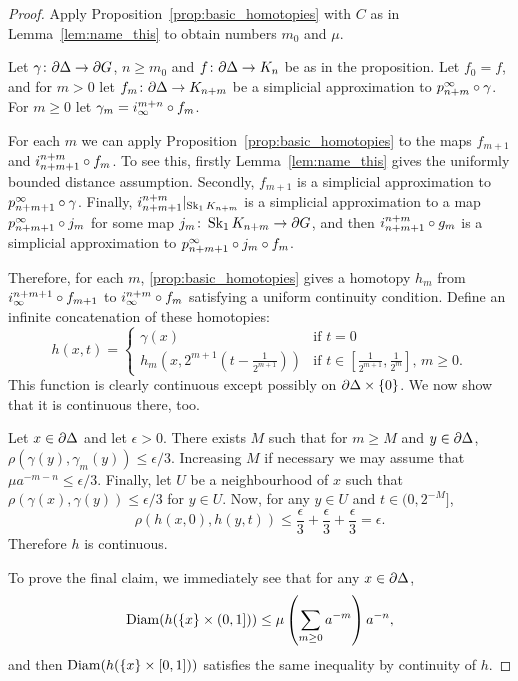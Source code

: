 \documentclass[a4paper]{article}
\begin{document}
\begin{proof}
  Apply Proposition~\ref{prop:basic_homotopies} with $C$ as in
  Lemma~\ref{lem:name_this} to obtain numbers $m_0$ and $\mu$.
  
  Let $\gamma\colon\partial\Delta\to\partial G$, $n\geq m_0$ and
  $f\colon\partial\Delta\to K_n$ be as in the proposition. Let $f_0 = f$,
  and for $m > 0$ let $f_m\colon\partial\Delta\to K_{n+m}$ be a
  simplicial approximation to $p^\infty_{n+m}\circ\gamma$. For $m \geq 0$
  let $\gamma_m = i^{m+n}_\infty\circ f_m$. 

  For each $m$ we can apply Proposition~\ref{prop:basic_homotopies} to the maps
  $f_{m+1}$ and $i^{n+m}_{n+m+1}\circ f_m$. To see this, firstly
  Lemma~\ref{lem:name_this} gives the uniformly bounded distance assumption.
  Secondly, $f_{m+1}$ is a simplicial approximation to
  $p^\infty_{n+m+1}\circ\gamma$. Finally,
  $i^{n+m}_{n+m+1}\vert_{\operatorname{Sk}_1 K_{n+m}}$ is a simplicial approximation
  to a map $p^\infty_{n+m+1}\circ j_m$ for some map $j_m\colon\operatorname{Sk}_1
  K_{n+m}\to \partial G$, and then $i^{n+m}_{n+m+1}\circ g_m$ is a
  simplicial approximation to $p^\infty_{n+m+1}\circ j_m\circ f_m$.
  
  Therefore, for each $m$, \cref{prop:basic_homotopies} gives a homotopy $h_m$
  from $i^{n+m+1}_\infty\circ f_{m+1}$ to $i^{n+m}_\infty \circ f_m$
  satisfying a uniform continuity condition. Define an infinite concatenation
  of these homotopies:
  \begin{equation*}
    h(x,t) = 
    \begin{cases}
      \gamma(x) & \text{if } t = 0\\
      h_m\left(x,2^{m+1}\left(t-\frac{1}{2^{m+1}}\right)\right) 
              & \text{if $t \in \left[\frac{1}{2^{m+1}}, \frac{1}{2^m}\right]$
                    , $m\geq 0$}.
    \end{cases}
  \end{equation*}
  This function is clearly continuous except possibly on
  $\partial\Delta\times\{0\}$. We now show that it is continuous there, too.

  Let $x \in \partial\Delta$ and let $\epsilon > 0$. There exists $M$ such
  that for $m \geq M$ and $y \in \partial \Delta$, $\rho(\gamma(y),
  \gamma_m(y)) \leq \epsilon/3$. Increasing $M$ if necessary we may assume that
  $\mu a^{-m-n} \leq \epsilon/3$.
  Finally, let $U$ be a neighbourhood of $x$ such that $\rho(\gamma(x),
  \gamma(y)) \leq \epsilon/3$ for $y \in U$. Now, for any $y \in U$ and $t \in (0, 2^{-M}]$,
  \begin{equation*}
    \rho(h(x,0), h(y,t)) \leq \frac{\epsilon}{3} + \frac{\epsilon}{3} +
        \frac{\epsilon}{3} = \epsilon.
  \end{equation*}
  Therefore $h$ is continuous.

  To prove the final claim, we immediately see that for any $x \in
  \partial\Delta$,
  \begin{equation*}
    \operatorname{Diam}(h(\{x\}\times (0,1])) \leq \mu \left(\sum_{m\geq 0} a^{-m}\right)a^{-n},
  \end{equation*}
  and then $\operatorname{Diam}(h(\{x\}\times [0,1]))$ satisfies the same inequality by
  continuity of $h$.
\end{proof}
\end{document}
